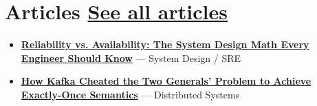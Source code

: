 \section*{Articles \hfill \href{https://medium.com/@HarshanaLF}{See all articles}} 
\BigDivider 
 
\small 
\begin{itemize}[leftmargin=*, itemsep=0.2em, topsep=0.1em] 
  \item \textbf{\href{https://medium.com/@HarshanaLF/reliability-vs-availability-the-system-design-math-every-engineer-should-know-6ba406803061}{Reliability vs. Availability: The System Design Math Every Engineer Should Know}} --- System Design / SRE 
  \item \textbf{\href{https://medium.com/@HarshanaLF/how-kafka-cheated-the-two-generals-problem-to-achieve-exactly-once-semantics-0c7848c5bb21}{How Kafka Cheated the Two Generals' Problem to Achieve Exactly-Once Semantics}} --- Distributed Systems 
\end{itemize} 
\normalsize
